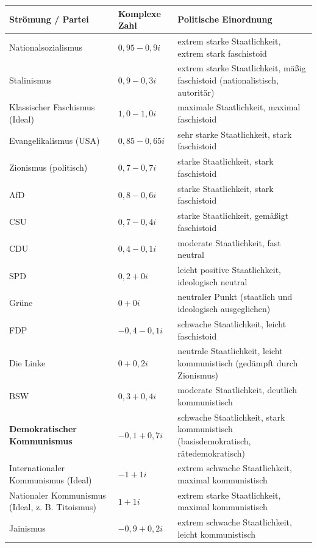 \documentclass[12pt, a4paper]{article}
\begin{document}
\noindent
\footnotesize
\begin{longtable}{lp{3.2cm}p{5.3cm}}
\toprule
\textbf{Strömung / Partei} & \textbf{Komplexe Zahl} & \textbf{Politische Einordnung} \\
\midrule
Nationalsozialismus & \(0{,}95 - 0{,}9i\) & extrem starke Staatlichkeit, extrem stark faschistoid \\
Stalinismus & \(0{,}9 - 0{,}3i\) & extrem starke Staatlichkeit, mäßig faschistoid (nationalistisch, autoritär) \\
Klassischer Faschismus (Ideal) & \(1{,}0 - 1{,}0i\) & maximale Staatlichkeit, maximal faschistoid \\
Evangelikalismus (USA) & \(0{,}85 - 0{,}65i\) & sehr starke Staatlichkeit, stark faschistoid \\
Zionismus (politisch) & \(0{,}7 - 0{,}7i\) & starke Staatlichkeit, stark faschistoid \\
AfD & \(0{,}8 - 0{,}6i\) & starke Staatlichkeit, stark faschistoid \\
CSU & \(0{,}7 - 0{,}4i\) & starke Staatlichkeit, gemäßigt faschistoid \\
CDU & \(0{,}4 - 0{,}1i\) & moderate Staatlichkeit, fast neutral \\
SPD & \(0{,}2 + 0i\) & leicht positive Staatlichkeit, ideologisch neutral \\
Grüne & \(0 + 0i\) & neutraler Punkt (staatlich und ideologisch ausgeglichen) \\
FDP & \(-0{,}4 - 0{,}1i\) & schwache Staatlichkeit, leicht faschistoid \\
Die Linke & \(0 + 0{,}2i\) & neutrale Staatlichkeit, leicht kommunistisch (gedämpft durch Zionismus) \\
BSW & \(0{,}3 + 0{,}4i\) & moderate Staatlichkeit, deutlich kommunistisch \\
\textbf{Demokratischer Kommunismus} & \(-0{,}1 + 0{,}7i\) & schwache Staatlichkeit, stark kommunistisch (basisdemokratisch, rätedemokratisch) \\
Internationaler Kommunismus (Ideal) & \(-1 + 1i\) & extrem schwache Staatlichkeit, maximal kommunistisch \\
Nationaler Kommunismus (Ideal, z. B. Titoismus) & \(1 + 1i\) & extrem starke Staatlichkeit, maximal kommunistisch \\
Jainismus & \(-0{,}9 + 0{,}2i\) & extrem schwache Staatlichkeit, leicht kommunistisch \\
\bottomrule
\end{longtable}
\normalsize
\end{document}
